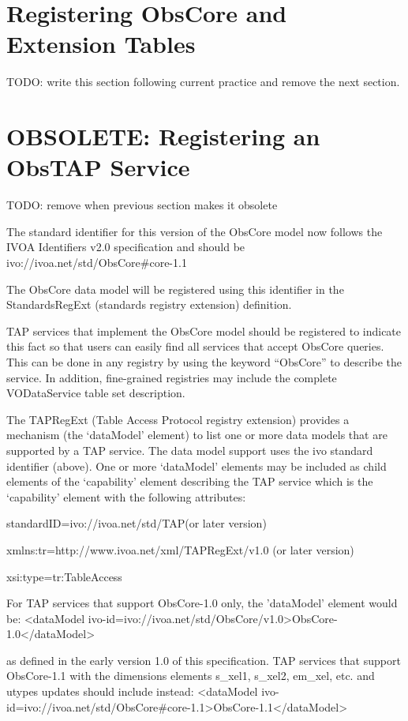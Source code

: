 \documentclass[11pt,a4paper]{ivoa}
\begin{document}
\section{Registering ObsCore and Extension Tables}
TODO: write this section following current practice and remove the next section.

\section{OBSOLETE: Registering an ObsTAP Service}
TODO: remove when previous section makes it obsolete

\label{sec:obstap-register}The standard identifier for this version of the ObsCore model now follows the IVOA Identifiers
v2.0 specification \citep{2016ivoa.spec.0523D} and should be ivo://ivoa.net/std/ObsCore\#core-1.1

The ObsCore data model will be registered using this identifier in the StandardsRegExt (standards registry extension)
definition.

TAP services that implement the ObsCore model should be registered to indicate this fact so that users can easily find
all services that accept ObsCore queries. This can be done in any registry by using the keyword ``ObsCore'' to describe
the service. In addition, fine-grained registries may include the complete VODataService table set description.

The TAPRegExt (Table Access Protocol registry extension) \citep{2012ivoa.spec.0827D}  provides a mechanism (the
`dataModel' element) to list one or more data models that are supported by a TAP service. The data model support uses
the ivo standard identifier (above). One or more `dataModel' elements may be included as child elements of the
{}`capability' element describing the TAP service which is the `capability' element with the following attributes:

standardID={\textquotedbl}ivo://ivoa.net/std/TAP{\textquotedbl}(or later version)

xmlns:tr={\textquotedbl}http://www.ivoa.net/xml/TAPRegExt/v1.0{\textquotedbl} (or later version)

xsi:type={\textquotedbl}tr:TableAccess{\textquotedbl}

For TAP services that support ObsCore-1.0 only, the {}'dataModel' element would be:   {\textless}dataModel
ivo-id={\textquotedbl}ivo://ivoa.net/std/ObsCore/v1.0{\textquotedbl}{\textgreater}ObsCore-1.0{\textless}/dataModel{\textgreater}


as defined in the early version 1.0 of this specification.  TAP services that support ObsCore-1.1 with the dimensions
elements s\_xel1, s\_xel2, em\_xel, etc. and utypes updates should include instead:  {\textless}dataModel
ivo-id={\textquotedbl}ivo://ivoa.net/std/ObsCore\#core-1.1{\textquotedbl}{\textgreater}ObsCore-1.1{\textless}/dataModel{\textgreater}
\end{document}
